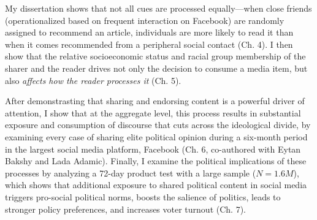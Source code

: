\documentclass[12pt]{article}
\begin{document}
My dissertation shows that not all cues are processed equally---when close friends (operationalized based on frequent interaction on Facebook) are randomly assigned to recommend an article, individuals are more likely to read it than when it comes recommended from a peripheral social contact (Ch. 4).  I then show that the relative socioeconomic status and racial group membership of the sharer and the reader drives not only the decision to consume a media item, but also \emph{affects how the reader processes it} (Ch. 5).  

After demonstrasting that sharing and endorsing content is a powerful driver of attention, I show that at the aggregate level, this process results in substantial exposure and consumption of discourse that cuts across the ideological divide, by examining every case of sharing elite political opinion during a six-month period in the largest social media platform, Facebook (Ch. 6, co-authored with Eytan Bakshy and Lada Adamic).  Finally, I examine the political implications of these processes by analyzing a 72-day product test with a large sample ($N=1.6M$), which shows that additional exposure to shared political content in social media triggers pro-social political norms, boosts the salience of politics, leads to stronger policy preferences, and increases voter turnout (Ch. 7).  

\end{document}
